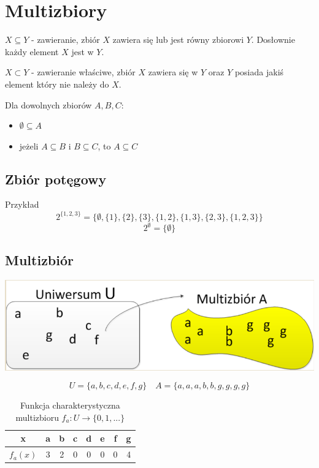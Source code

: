\section{Multizbiory}

$ X \subseteq Y $ - zawieranie, zbiór $X$ zawiera się lub jest równy zbiorowi $Y$.
Dosłownie każdy element $X$ jest w $Y$.

$ X \subset Y $ - zawieranie właściwe, zbiór $X$ zawiera się w $Y$ oraz $Y$ posiada jakiś element
który nie należy do $X$.

Dla dowolnych zbiorów $A, B, C$:
\begin{itemize}
    \item $\emptyset \subseteq A$
    \item jeżeli $ A \subseteq B $ i $ B \subseteq C $, to $ A \subseteq C $
\end{itemize}

\subsection{Zbiór potęgowy}
Przykład
$$ 2^{\{1, 2, 3\}} = \{\emptyset, \{1\}, \{2\}, \{3\}, \{1,2\}, \{1,3\}, \{2,3\}, \{1,2,3\}\} $$
$$ 2^{\emptyset} = \{ \emptyset \} $$

\subsection{Multizbiór}

\includegraphics[scale=0.5]{img/multizbior.png}

$$ U = \{a, b, c, d, e, f, g\} \quad A=\{a, a, a, b, b, g, g, g, g\} $$

\begin{table}[!ht]
    \centering
    \caption{Funkcja charakterystyczna multizbioru $ f_a : U \to \{0, 1, ...\} $}
    \begin{adjustbox}{width=0.5\textwidth}
    \begin{tabular}{|c|c|c|c|c|c|c|c|}
        \hline
        x & a & b & c & d & e & f & g \\ \hline
        $f_a(x)$ & 3 & 2 & 0 & 0 & 0 & 0 & 4 \\ \hline
    \end{tabular}
\end{adjustbox}
\end{table}

